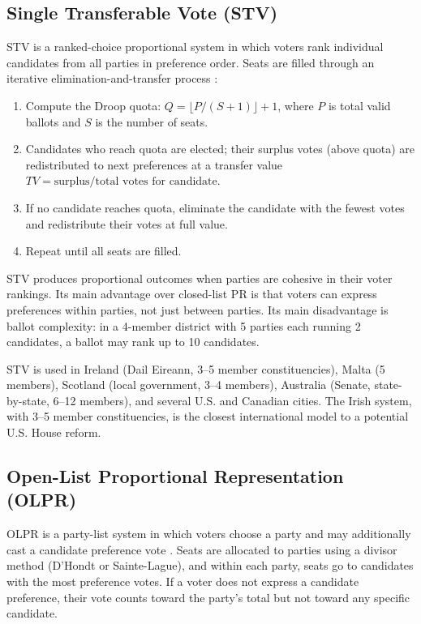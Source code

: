 \subsection{Single Transferable Vote (STV)}

STV is a ranked-choice proportional system in which voters rank individual
candidates from all parties in preference order.  Seats are filled through an
iterative elimination-and-transfer process \citep{gallagher2011ireland}:

\begin{enumerate}
  \item Compute the Droop quota: $Q = \lfloor P / (S + 1) \rfloor + 1$,
        where $P$ is total valid ballots and $S$ is the number of seats.
  \item Candidates who reach quota are elected; their surplus votes
        (above quota) are redistributed to next preferences at a
        transfer value $TV = \text{surplus} / \text{total votes for
        candidate}$.
  \item If no candidate reaches quota, eliminate the candidate with
        the fewest votes and redistribute their votes at full value.
  \item Repeat until all seats are filled.
\end{enumerate}

STV produces proportional outcomes when parties are cohesive in their voter
rankings.  Its main advantage over closed-list PR is that voters can express
preferences within parties, not just between parties.  Its main disadvantage
is ballot complexity: in a 4-member district with 5 parties each running 2
candidates, a ballot may rank up to 10 candidates.

STV is used in Ireland (Dail Eireann, 3--5 member constituencies), Malta
(5 members), Scotland (local government, 3--4 members), Australia (Senate,
state-by-state, 6--12 members), and several U.S. and Canadian cities.  The
Irish system, with 3--5 member constituencies, is the closest international
model to a potential U.S. House reform.

\subsection{Open-List Proportional Representation (OLPR)}

OLPR is a party-list system in which voters choose a party and may
additionally cast a candidate preference vote \citep{karvonen2004preferential}.
Seats are allocated to parties using a divisor method (D'Hondt or
Sainte-Lague), and within each party, seats go to candidates with the most
preference votes.  If a voter does not express a candidate preference, their
vote counts toward the party's total but not toward any specific candidate.

